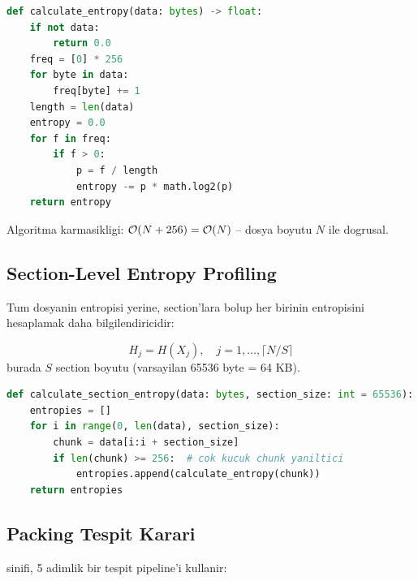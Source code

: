 \begin{lstlisting}[language=Python, caption={Shannon entropy implementasyonu (packed\_binary.py)}, label={lst:entropy-impl}]
def calculate_entropy(data: bytes) -> float:
    if not data:
        return 0.0
    freq = [0] * 256
    for byte in data:
        freq[byte] += 1
    length = len(data)
    entropy = 0.0
    for f in freq:
        if f > 0:
            p = f / length
            entropy -= p * math.log2(p)
    return entropy
\end{lstlisting}

Algoritma karmasikligi: $\mathcal{O}\!\left(N + 256\right) = \mathcal{O}\!\left(N\right)$ -- dosya boyutu $N$ ile dogrusal.

\subsection{Section-Level Entropy Profiling}

Tum dosyanin entropisi yerine, section'lara bolup her birinin entropisini
hesaplamak daha bilgilendiricidir:

\begin{equation}
  H_j = H(X_j), \quad j = 1, \ldots, \lceil N / S \rceil
  \label{eq:section-entropy}
\end{equation}
burada $S$ section boyutu (varsayilan 65536 byte = 64 KB).

\begin{lstlisting}[language=Python, caption={Section-level entropy (packed\_binary.py)}]
def calculate_section_entropy(data: bytes, section_size: int = 65536):
    entropies = []
    for i in range(0, len(data), section_size):
        chunk = data[i:i + section_size]
        if len(chunk) >= 256:  # cok kucuk chunk yaniltici
            entropies.append(calculate_entropy(chunk))
    return entropies
\end{lstlisting}

\subsection{Packing Tespit Karari}

 sinifi, 5 adimlik bir tespit pipeline'i kullanir:

